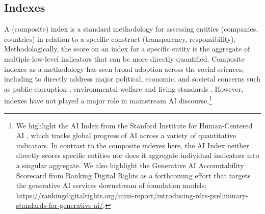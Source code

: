 \hypertarget{index}{\subsection{Indexes}}
\label{sec:background-index}
A (composite) index is a standard methodology \citep{oecd2008handbook, greco2019methodological} for assessing entities (\eg companies, countries) in relation to a specific construct (\eg transparency, responsibility).
Methodologically, the score on an index for a specific entity is the aggregate of multiple low-level indicators that can be more directly quantified. 
Composite indexes as a methodology has seen broad adoption across the social sciences, including to directly address major political, economic, and societal concerns such as public corruption \citep[\eg Transparency International’s Corruption Perceptions Index;][]{ti2022corrupt}, environmental welfare \citep[\eg the World Economic Forum’s Environmental Sustainability Index;][]{whitford2009political} and living standards \citep[\eg the United Nations Development Programme’s Human Development Index;][]{hopkins1991human}. 
However, indexes have not played a major role in mainstream AI discourse.\footnote{We highlight the AI Index from the Stanford Institute for Human-Centered AI \citep{maslej2023ai, zhang2022ai}, which tracks global progress of AI across a variety of quantitative indicators. 
In contrast to the composite indexes here, the AI Index neither directly scores specific entities nor does it aggregate individual indicators into a singular aggregate.
We also highlight the Generative AI Accountability Scorecard from Ranking Digital Rights as a forthcoming effort that targets the generative AI services downstream of foundation models: \url{https://rankingdigitalrights.org/mini-report/introducing-rdrs-preliminary-standards-for-generative-ai/}.
}

